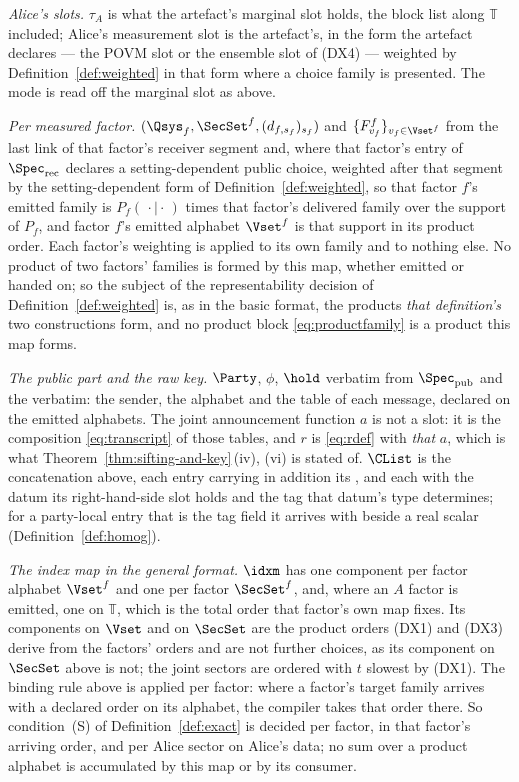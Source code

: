 \begin{definition}
\emph{Alice's slots.} $\tau_A$ is what the artefact's marginal slot holds,
the block list along $\mathbb{T}$ included; Alice's measurement slot is the
artefact's, in the form the artefact declares --- the POVM slot or the
ensemble slot of (DX4) --- weighted by Definition~\ref{def:weighted} in that
form where a choice family is presented. The mode is read off the
marginal slot as above.

\emph{Per measured factor.} $(\Qsys_f,\SecSet^{f},(d_{f,s_f})_{s_f})$ and
$\{F^{f}_{v_f}\}_{v_f\in\Vset^{f}}$ from the last link of that factor's
receiver segment and, where that factor's entry of $\Spec_{\mathrm{rec}}$
declares a setting-dependent public choice, weighted after that segment by the
setting-dependent form of Definition~\ref{def:weighted}, so that factor $f$'s
emitted family is $P_f(\,\cdot\mid\cdot\,)$ times that factor's delivered
family over the support of $P_f$, and factor $f$'s emitted alphabet
$\Vset^{f}$ is that support in its product order. Each factor's weighting is
applied to its own family and to nothing else. No product of two factors'
families is formed by this map, whether emitted or handed on; so the subject of the
representability decision of Definition~\ref{def:weighted} is, as in the basic
format, the products \emph{that definition's} two constructions form, and no
product block \eqref{eq:productfamily} is a product this map forms.

\emph{The public part and the raw key.} $\Party$, $\phi$, $\hold$ verbatim
from $\Spec_{\mathrm{pub}}$ and the  verbatim: the sender,
the alphabet and the table of each message, declared on the emitted
alphabets. The joint announcement function $a$ is not a slot: it is the
composition \eqref{eq:transcript} of those tables, and $r$ is \eqref{eq:rdef}
with \emph{that} $a$, which is what Theorem~\ref{thm:sifting-and-key}\,(iv), (vi) is
stated of. $\CList$ is the concatenation above, each entry carrying in
addition its , and each with the datum its right-hand-side slot
holds and the tag that datum's type determines; for a party-local entry that
is the tag field it arrives with beside a real scalar
(Definition~\ref{def:homog}).

\emph{The index map in the general format.} $\idxm$ has one component per
factor alphabet $\Vset^{f}$ and one per factor  $\SecSet^{f}$, and,
where an $A$ factor is emitted, one on $\mathbb{T}$, which is the total order
that factor's own map fixes. Its components on $\Vset$ and on $\SecSet$ are
the product orders (DX1) and (DX3) derive from the factors' orders and are not
further choices, as its component on $\SecSet$ above is not; the joint sectors
are ordered with $t$ slowest by (DX1). The binding rule above is applied per
factor: where a factor's target family arrives with a declared order on its
alphabet, the compiler takes that order there. So condition~(S) of
Definition~\ref{def:exact} is decided per factor, in that factor's arriving
order, and per Alice sector on Alice's data; no sum over a product alphabet is
accumulated by this map or by its consumer.
\end{definition}
